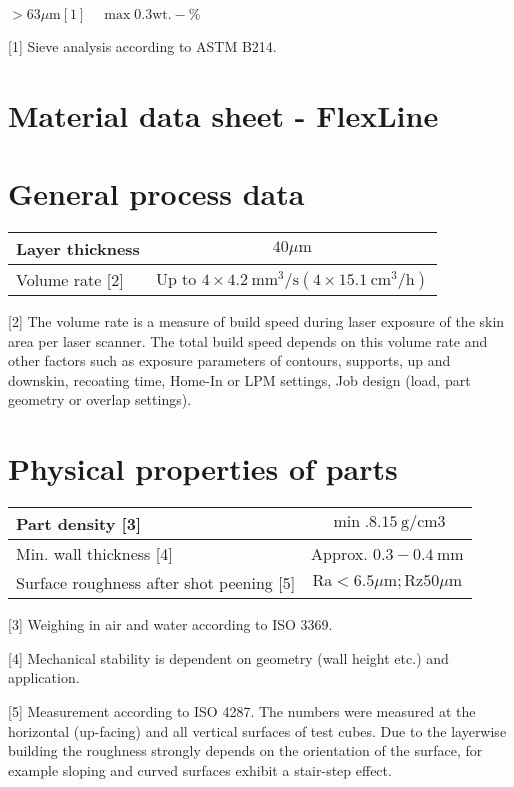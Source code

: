 \documentclass[10pt]{article}
\begin{document}
$>63 \mu \mathrm{m}[1] \quad \max 0.3 \mathrm{wt} .-\%$

[1] Sieve analysis according to ASTM B214.

\section*{Material data sheet - FlexLine}
\section*{General process data}
\begin{center}
\begin{tabular}{lc}
\hline
Layer thickness & $40 \mu \mathrm{m}$ \\
\hline
Volume rate [2] & Up to $4 \times 4.2 \mathrm{~mm}^{3} / \mathrm{s}\left(4 \times 15.1 \mathrm{~cm}^{3} / \mathrm{h}\right)$ \\
\hline
\end{tabular}
\end{center}

[2] The volume rate is a measure of build speed during laser exposure of the skin area per laser scanner. The total build speed depends on this volume rate and other factors such as exposure parameters of contours, supports, up and downskin, recoating time, Home-In or LPM settings, Job design (load, part geometry or overlap settings).

\section*{Physical properties of parts}
\begin{center}
\begin{tabular}{lc}
\hline
Part density [3] & $\min .8 .15 \mathrm{~g} / \mathrm{cm} 3$ \\
\hline
Min. wall thickness [4] & Approx. $0.3-0.4 \mathrm{~mm}$ \\
\hline
Surface roughness after shot peening [5] & $\mathrm{Ra}<6.5 \mu \mathrm{m} ; \mathrm{Rz} 50 \mu \mathrm{m}$ \\
\hline
\end{tabular}
\end{center}

[3] Weighing in air and water according to ISO 3369.

[4] Mechanical stability is dependent on geometry (wall height etc.) and application.

[5] Measurement according to ISO 4287. The numbers were measured at the horizontal (up-facing) and all vertical surfaces of test cubes. Due to the layerwise building the roughness strongly depends on the orientation of the surface, for example sloping and curved surfaces exhibit a stair-step effect.
\end{document}
